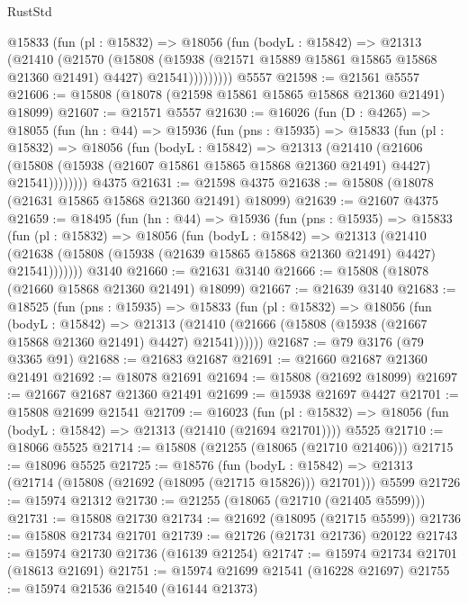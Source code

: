 \begin{lexlean}{RustStd}
\begin{coremodule}
          @15833
            (fun (pl : @15832) =>
            @18056
              (fun (bodyL : @15842) =>
              @21313
                (@21410
                  (@21570
                    (@15808
                      (@15938 (@21571 @15889 @15861 @15865 @15868 @21360 @21491) @4427)
                      @21541)))))))))
    @5557
@21598 := @21561 @5557
@21606 := @15808 (@18078 (@21598 @15861 @15865 @15868 @21360 @21491) @18099)
@21607 := @21571 @5557
@21630 := @16026
    (fun (D : @4265) =>
    @18055
      (fun (hn : @44) =>
      @15936
        (fun (pns : @15935) =>
        @15833
          (fun (pl : @15832) =>
          @18056
            (fun (bodyL : @15842) =>
            @21313
              (@21410
                (@21606
                  (@15808 (@15938 (@21607 @15861 @15865 @15868 @21360 @21491) @4427) @21541))))))))
    @4375
@21631 := @21598 @4375
@21638 := @15808 (@18078 (@21631 @15865 @15868 @21360 @21491) @18099)
@21639 := @21607 @4375
@21659 := @18495
    (fun (hn : @44) =>
    @15936
      (fun (pns : @15935) =>
      @15833
        (fun (pl : @15832) =>
        @18056
          (fun (bodyL : @15842) =>
          @21313
            (@21410
              (@21638 (@15808 (@15938 (@21639 @15865 @15868 @21360 @21491) @4427) @21541)))))))
    @3140
@21660 := @21631 @3140
@21666 := @15808 (@18078 (@21660 @15868 @21360 @21491) @18099)
@21667 := @21639 @3140
@21683 := @18525
    (fun (pns : @15935) =>
    @15833
      (fun (pl : @15832) =>
      @18056
        (fun (bodyL : @15842) =>
        @21313 (@21410 (@21666 (@15808 (@15938 (@21667 @15868 @21360 @21491) @4427) @21541))))))
@21687 := @79 @3176 (@79 @3365 @91)
@21688 := @21683 @21687
@21691 := @21660 @21687 @21360 @21491
@21692 := @18078 @21691
@21694 := @15808 (@21692 @18099)
@21697 := @21667 @21687 @21360 @21491
@21699 := @15938 @21697 @4427
@21701 := @15808 @21699 @21541
@21709 := @16023
    (fun (pl : @15832) => @18056 (fun (bodyL : @15842) => @21313 (@21410 (@21694 @21701))))
    @5525
@21710 := @18066 @5525
@21714 := @15808 (@21255 (@18065 (@21710 @21406)))
@21715 := @18096 @5525
@21725 := @18576
    (fun (bodyL : @15842) => @21313 (@21714 (@15808 (@21692 (@18095 (@21715 @15826))) @21701)))
    @5599
@21726 := @15974 @21312
@21730 := @21255 (@18065 (@21710 (@21405 @5599)))
@21731 := @15808 @21730
@21734 := @21692 (@18095 (@21715 @5599))
@21736 := @15808 @21734 @21701
@21739 := @21726 (@21731 @21736) @20122
@21743 := @15974 @21730 @21736 (@16139 @21254)
@21747 := @15974 @21734 @21701 (@18613 @21691)
@21751 := @15974 @21699 @21541 (@16228 @21697)
@21755 := @15974 @21536 @21540 (@16144 @21373)

\end{coremodule}
\end{lexlean}
